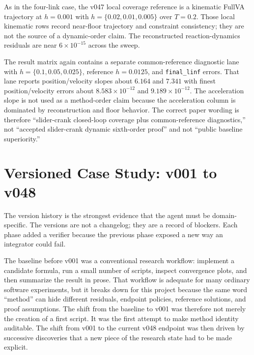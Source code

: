 \documentclass[10pt]{article}
\begin{document}
As in the four-link case, the v047 local coverage reference is a kinematic
FullVA trajectory at $h=0.001$ with $h=\{0.02,0.01,0.005\}$ over $T=0.2$.
Those local kinematic rows record near-floor trajectory and constraint
consistency; they are not the source of a dynamic-order claim. The
reconstructed reaction-dynamics residuals are near $6\times10^{-15}$ across
the sweep.

The result matrix again contains a separate common-reference diagnostic lane
with $h=\{0.1,0.05,0.025\}$, reference $h=0.0125$, and \texttt{final\_linf}
errors. That lane reports position/velocity slopes about $6.164$ and $7.341$
with finest position/velocity errors about $8.583\times10^{-12}$ and
$9.189\times10^{-12}$. The acceleration slope is not used as a method-order
claim because the acceleration column is dominated by reconstruction and
floor behavior. The correct paper wording is therefore ``slider-crank
closed-loop coverage plus common-reference diagnostics,'' not ``accepted
slider-crank dynamic sixth-order proof'' and not ``public baseline
superiority.''

\section{Versioned Case Study: v001 to v048}

The version history is the strongest evidence that the agent must be
domain-specific. The versions are not a changelog; they are a record of
blockers. Each phase added a verifier because the previous phase exposed a new
way an integrator could fail.

The baseline before v001 was a conventional research workflow: implement a
candidate formula, run a small number of scripts, inspect convergence plots,
and then summarize the result in prose. That workflow is adequate for many
ordinary software experiments, but it breaks down for this project because the
same word ``method'' can hide different residuals, endpoint policies,
reference solutions, and proof assumptions. The shift from the baseline to
v001 was therefore not merely the creation of a first script. It was the first
attempt to make method identity auditable. The shift from v001 to the current
v048 endpoint was then driven by successive discoveries that a new piece of
the research state had to be made explicit.
\end{document}
